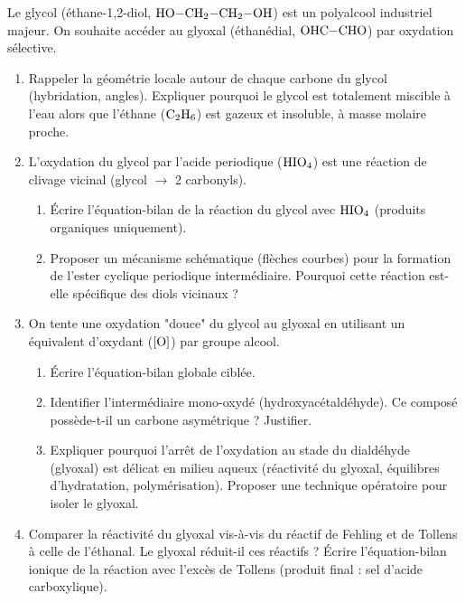 \documentclass[11pt]{article}
\begin{document}
\begin{exercice}
Le glycol (éthane-1,2-diol, $\ce{HO-CH2-CH2-OH}$) est un polyalcool industriel majeur. On souhaite accéder au glyoxal (éthanédial, $\ce{OHC-CHO}$) par oxydation sélective.
\begin{enumerate}
    \item Rappeler la géométrie locale autour de chaque carbone du glycol (hybridation, angles). Expliquer pourquoi le glycol est totalement miscible à l'eau alors que l'éthane ($\ce{C2H6}$) est gazeux et insoluble, à masse molaire proche.
    \item L'oxydation du glycol par l'acide periodique ($\ce{HIO4}$) est une réaction de clivage vicinal (glycol $\to$ 2 carbonyls).
    \begin{enumerate}
        \item Écrire l'équation-bilan de la réaction du glycol avec $\ce{HIO4}$ (produits organiques uniquement).
        \item Proposer un mécanisme schématique (flèches courbes) pour la formation de l'ester cyclique periodique intermédiaire. Pourquoi cette réaction est-elle spécifique des diols vicinaux ?
    \end{enumerate}
    \item On tente une oxydation "douce" du glycol au glyoxal en utilisant un équivalent d'oxydant ($\ce{[O]}$) par groupe alcool.
    \begin{enumerate}
        \item Écrire l'équation-bilan globale ciblée.
        \item Identifier l'intermédiaire mono-oxydé (hydroxyacétaldéhyde). Ce composé possède-t-il un carbone asymétrique ? Justifier.
        \item Expliquer pourquoi l'arrêt de l'oxydation au stade du dialdéhyde (glyoxal) est délicat en milieu aqueux (réactivité du glyoxal, équilibres d'hydratation, polymérisation). Proposer une technique opératoire pour isoler le glyoxal.
    \end{enumerate}
    \item Comparer la réactivité du glyoxal vis-à-vis du réactif de Fehling et de Tollens à celle de l'éthanal. Le glyoxal réduit-il ces réactifs ? Écrire l'équation-bilan ionique de la réaction avec l'excès de Tollens (produit final : sel d'acide carboxylique).
\end{enumerate}
\end{exercice}
\end{document}
